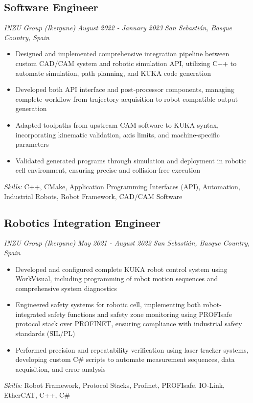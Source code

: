 \documentclass[11pt,a4paper]{article}
\begin{document}
\subsection{Software Engineer}
\textit{INZU Group (Ikergune)} \hfill \textit{August 2022 - January 2023}
\textit{San Sebastián, Basque Country, Spain}
\begin{itemize}
    \item Designed and implemented comprehensive integration pipeline between custom CAD/CAM system and robotic simulation API, utilizing C++ to automate simulation, path planning, and KUKA code generation
    \item Developed both API interface and post-processor components, managing complete workflow from trajectory acquisition to robot-compatible output generation
    \item Adapted toolpaths from upstream CAM software to KUKA syntax, incorporating kinematic validation, axis limits, and machine-specific parameters
    \item Validated generated programs through simulation and deployment in robotic cell environment, ensuring precise and collision-free execution
\end{itemize}
\textit{Skills:} C++, CMake, Application Programming Interfaces (API), Automation, Industrial Robots, Robot Framework, CAD/CAM Software

\subsection{Robotics Integration Engineer}
\textit{INZU Group (Ikergune)} \hfill \textit{May 2021 - August 2022}
\textit{San Sebastián, Basque Country, Spain}
\begin{itemize}
    \item Developed and configured complete KUKA robot control system using WorkVisual, including programming of robot motion sequences and comprehensive system diagnostics
    \item Engineered safety systems for robotic cell, implementing both robot-integrated safety functions and safety zone monitoring using PROFIsafe protocol stack over PROFINET, ensuring compliance with industrial safety standards (SIL/PL)
    \item Performed precision and repeatability verification using laser tracker systems, developing custom C\# scripts to automate measurement sequences, data acquisition, and error analysis
\end{itemize}
\textit{Skills:} Robot Framework, Protocol Stacks, Profinet, PROFIsafe, IO-Link, EtherCAT, C++, C\#
\end{document}
